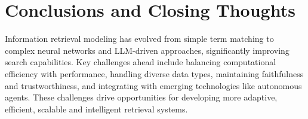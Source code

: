 

\section{Conclusions and Closing Thoughts}
\label{sec:conclusion}

Information retrieval modeling has evolved from simple term matching to complex neural networks and LLM-driven approaches, significantly improving search capabilities. 
Key challenges ahead include balancing computational efficiency with performance, handling diverse data types, maintaining faithfulness and trustworthiness, and integrating with emerging technologies like autonomous agents. These challenges drive opportunities for developing more adaptive, efficient, scalable and intelligent retrieval systems.